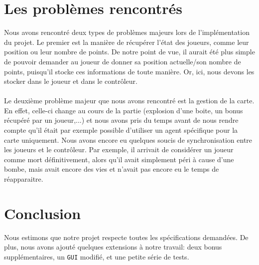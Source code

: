 \documentclass{article}
\begin{document}
\section{Les problèmes rencontrés}
Nous avons rencontré deux types de problèmes majeurs lors de l'implémentation du projet. Le premier est la manière de récupérer l'état des joueurs, comme leur position ou leur nombre de points. De notre point de vue, il aurait été plus simple de pouvoir demander au joueur de donner sa position actuelle/son nombre de points, puisqu'il stocke ces informations de toute manière. Or, ici, nous devons les stocker dans le joueur et dans le contrôleur.\\ \\
Le deuxième problème majeur que nous avons rencontré est la gestion de la carte. En effet, celle-ci change au cours de la partie (explosion d'une boite, un bonus récupéré par un joueur,...) et nous avons pris du temps avant de nous rendre compte qu'il était par exemple possible d'utiliser un agent spécifique pour la carte uniquement. Nous avons encore eu quelques soucis de synchronisation entre les joueurs et le contrôleur. Par exemple, il arrivait de considérer un joueur comme mort définitivement, alors qu'il avait simplement péri à cause d'une bombe, mais avait encore des vies et n'avait pas encore eu le temps de réapparaitre.

\section{Conclusion}
Nous estimons que notre projet respecte toutes les spécifications demandées. De plus, nous avons ajouté quelques extensions à notre travail: deux bonus supplémentaires, un \texttt{GUI} modifié, et une petite série de tests. 
\end{document}
